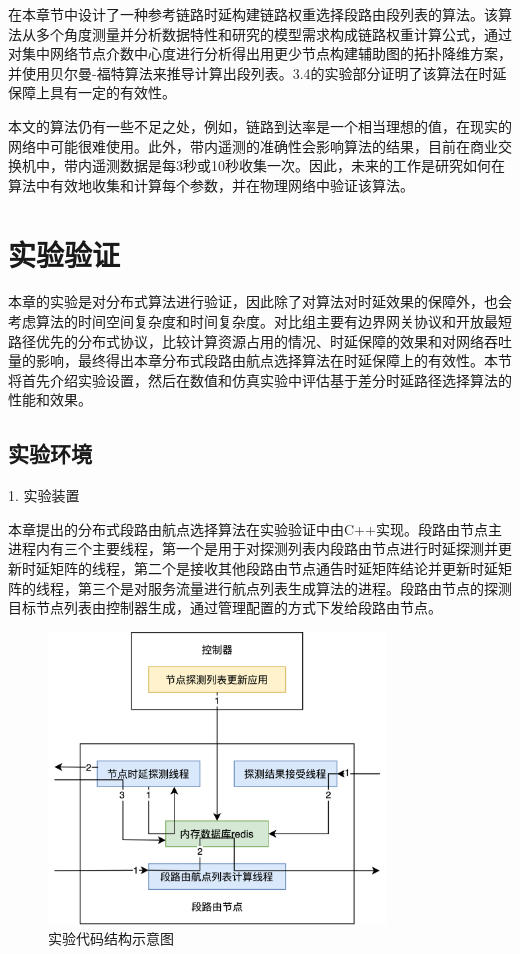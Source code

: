 在本章节中设计了一种参考链路时延构建链路权重选择段路由段列表的算法。该算法从多个角度测量并分析数据特性和研究的模型需求构成链路权重计算公式，通过对集中网络节点介数中心度进行分析得出用更少节点构建辅助图的拓扑降维方案，并使用贝尔曼-福特算法来推导计算出段列表。3.4的实验部分证明了该算法在时延保障上具有一定的有效性。

本文的算法仍有一些不足之处，例如，链路到达率是一个相当理想的值，在现实的网络中可能很难使用。此外，带内遥测的准确性会影响算法的结果，目前在商业交换机中，带内遥测数据是每3秒或10秒收集一次。因此，未来的工作是研究如何在算法中有效地收集和计算每个参数，并在物理网络中验证该算法。

\section{实验验证}

本章的实验是对分布式算法进行验证，因此除了对算法对时延效果的保障外，也会考虑算法的时间空间复杂度和时间复杂度。对比组主要有边界网关协议和开放最短路径优先的分布式协议，比较计算资源占用的情况、时延保障的效果和对网络吞吐量的影响，最终得出本章分布式段路由航点选择算法在时延保障上的有效性。本节将首先介绍实验设置，然后在数值和仿真实验中评估基于差分时延路径选择算法的性能和效果。

\subsection{实验环境}

1. 实验装置

本章提出的分布式段路由航点选择算法在实验验证中由C++实现。段路由节点主进程内有三个主要线程，第一个是用于对探测列表内段路由节点进行时延探测并更新时延矩阵的线程，第二个是接收其他段路由节点通告时延矩阵结论并更新时延矩阵的线程，第三个是对服务流量进行航点列表生成算法的进程。段路由节点的探测目标节点列表由控制器生成，通过管理配置的方式下发给段路由节点。

\begin{figure}[htbp]
\setlength{\abovecaptionskip}{15pt plus 3pt minus 2pt}
\centerline{\includegraphics[width=0.8\textwidth]{./figures/ch4-test-code.png}}
\caption{实验代码结构示意图}
\label{fig-ch4-test-code}
\end{figure}
    
